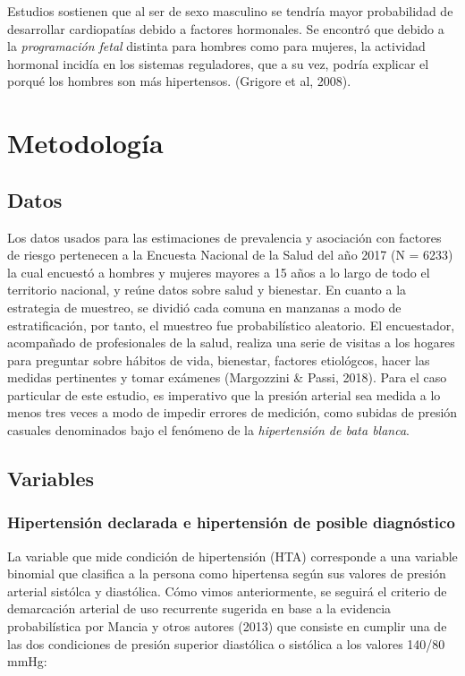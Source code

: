 \documentclass{aa}
\begin{document}
Estudios sostienen que al ser de sexo masculino se tendría mayor probabilidad de desarrollar cardiopatías debido a factores hormonales. Se encontró que debido a la \textit{programación fetal} distinta para hombres como para mujeres, la actividad hormonal incidía en los sistemas reguladores, que a su vez, podría explicar el porqué los hombres son más hipertensos. (Grigore et al, 2008).

\section{Metodología}

\subsection{Datos}

Los datos usados para las estimaciones de prevalencia y asociación con factores de riesgo pertenecen a la Encuesta Nacional de la Salud del año 2017 (N = 6233) la cual encuestó a hombres y mujeres mayores a 15 años a lo largo de todo el territorio nacional, y reúne datos sobre salud y bienestar. En cuanto a la estrategia de muestreo, se dividió cada comuna en manzanas a modo de estratificación, por tanto, el muestreo fue probabilístico aleatorio. 
El encuestador, acompañado de profesionales de la salud, realiza una serie de visitas a los hogares para preguntar sobre hábitos de vida, bienestar, factores etiológcos, hacer las medidas pertinentes y tomar exámenes (Margozzini \& Passi, 2018). Para el caso particular de este estudio, es imperativo que la presión arterial sea medida a lo menos tres veces a modo de impedir errores de medición, como subidas de presión casuales denominados bajo el fenómeno de la \textit{hipertensión de bata blanca}.

\subsection{Variables}

\subsubsection{Hipertensión declarada e hipertensión de posible diagnóstico}

La variable que mide condición de hipertensión (HTA) corresponde a una variable binomial que clasifica a la persona como hipertensa según sus valores de presión arterial sistólca y diastólica. Cómo vimos anteriormente, se seguirá el criterio de demarcación arterial de uso recurrente sugerida en base a la evidencia probabilística por Mancia y otros autores (2013) que consiste en cumplir una de las dos condiciones de presión superior diastólica o sistólica a los valores 140/80 mmHg:
\end{document}
